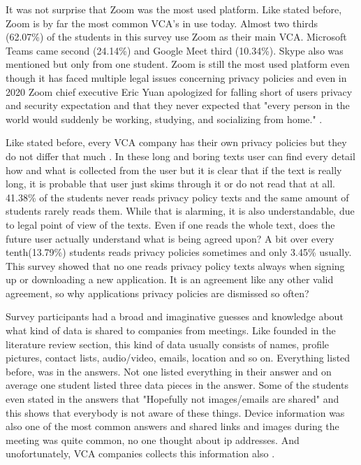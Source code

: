 \documentclass[utf8,english]{gradu3}
\begin{document}
It was not surprise that Zoom was the most used platform. Like stated before, Zoom is by far the most common VCA's in use today. Almost two thirds (62.07\%) of the students in this survey use Zoom as their main VCA. Microsoft Teams came second (24.14\%) and Google Meet third (10.34\%). Skype also was mentioned but only from one student. Zoom is still the most used platform even though it has faced multiple legal issues concerning privacy policies and even in 2020 Zoom chief executive Eric Yuan apologized for falling short of users privacy and security expectation and that they never expected that "every person in the world would suddenly be working, studying, and socializing from home." \parencite{zoomFlaws}.

Like stated before, every VCA company has their own privacy policies but they do not differ that much \parencite{ZoomGoogleMS}. In these long and boring texts user can find every detail how and what is collected from the user but it is clear that if the text is really long, it is probable that user just skims through it or do not read that at all. 41.38\% of the students never reads privacy policy texts and the same amount of students rarely reads them. While that is alarming, it is also understandable, due to legal point of view of the texts. Even if one reads the whole text, does the future user actually understand what is being agreed upon? A bit over every tenth(13.79\%) students reads privacy policies sometimes and only 3.45\% usually. This survey showed that no one reads privacy policy texts always when signing up or downloading a new application. It is an agreement like any other valid agreement, so why applications privacy policies are dismissed so often? 

Survey participants had a broad and imaginative guesses and knowledge about what kind of data is shared to companies from meetings. Like founded in the literature review section, this kind of data usually consists of names, profile pictures, contact lists, audio/video, emails, location and so on. Everything listed before, was in the answers. Not one listed everything in their answer and on average one student listed three data pieces in the answer. Some of the students even stated in the answers that "Hopefully not images/emails are shared" and this shows that everybody is not aware of these things. 
Device information was also one of the most common answers and shared links and images during the meeting was quite common, no one thought about ip addresses. And unofortunately, VCA companies collects this information also \parencite{zoomCollect}. 
\end{document}
